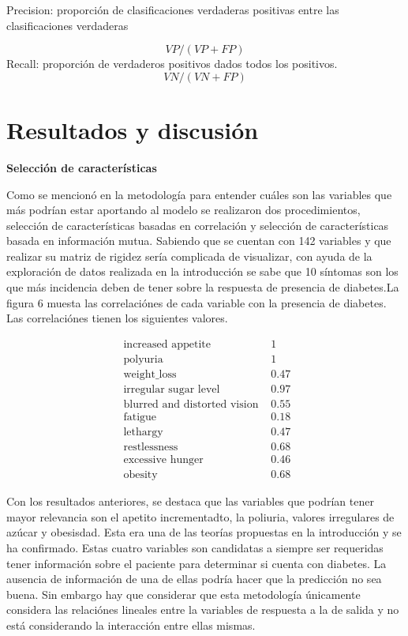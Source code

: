 \documentclass[twocolumn]{bmcart}%
\begin{document}
\begin{itemize}
        \subitem Precision: proporción de clasificaciones verdaderas positivas entre las clasificaciones verdaderas

            \begin{equation}
            V P /(V P+F P)
            \end{equation}
        \subitem Recall: proporción de verdaderos positivos dados todos los positivos.
            \begin{equation}
                        V N /(V N+F P)
            \end{equation}


\section*{Resultados y discusión}

\textbf{Selección de características}

Como se mencionó en la metodología para entender cuáles son las variables que más podrían estar aportando al modelo se realizaron dos procedimientos, selección de características basadas en correlación y  selección de características basada en información mutua. Sabiendo que se cuentan con 142 variables y que realizar su matriz de rigidez sería complicada de visualizar, con ayuda de la exploración de datos realizada en la introducción se sabe que 10 síntomas son los que más incidencia deben de tener sobre la respuesta de presencia de diabetes.La figura 6 muesta las correlaciónes de cada variable con la presencia de diabetes. Las correlaciónes tienen los siguientes valores. 

$$
\begin{array}{cc}
\text { increased appetite } & 1 \\
\text { polyuria } & 1 \\
\text { weight_loss } & 0.47 \\
\text { irregular sugar level } & 0.97 \\
\text { blurred and distorted vision } & 0.55 \\
\text { fatigue } & 0.18 \\
\text { lethargy } & 0.47 \\
\text { restlessness } & 0.68 \\
\text { excessive hunger } & 0.46 \\
\text { obesity } & 0.68
\end{array}
$$

Con los resultados anteriores, se destaca que las variables que podrían tener mayor relevancia son el apetito incrementadto, la poliuria, valores irregulares de azúcar y obesisdad. Esta era una de las teorías propuestas en la introducción y se ha confirmado. Estas cuatro variables son candidatas a siempre ser requeridas tener información sobre el paciente para determinar si cuenta con diabetes. La ausencia de información de una de ellas podría hacer que la predicción no sea buena. Sin embargo hay que considerar que esta metodología únicamente considera las relaciónes lineales entre la variables de respuesta a la de salida y no está considerando la interacción entre ellas mismas. 


\end{itemize}
\end{document}

